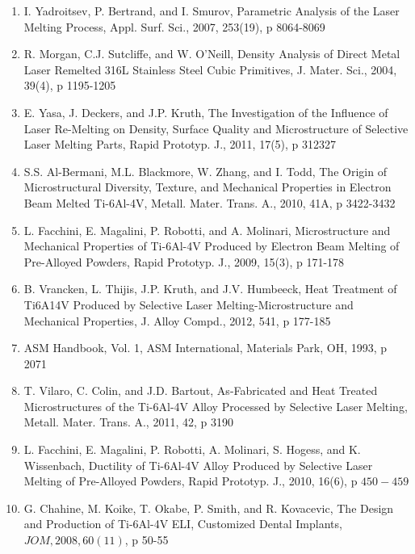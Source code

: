 \documentclass[10pt]{article}
\begin{document}
\begin{enumerate}
  \item I. Yadroitsev, P. Bertrand, and I. Smurov, Parametric Analysis of the Laser Melting Process, Appl. Surf. Sci., 2007, 253(19), p 8064-8069

  \item R. Morgan, C.J. Sutcliffe, and W. O'Neill, Density Analysis of Direct Metal Laser Remelted 316L Stainless Steel Cubic Primitives, J. Mater. Sci., 2004, 39(4), p 1195-1205

  \item E. Yasa, J. Deckers, and J.P. Kruth, The Investigation of the Influence of Laser Re-Melting on Density, Surface Quality and Microstructure of Selective Laser Melting Parts, Rapid Prototyp. J., 2011, 17(5), p 312327

  \item S.S. Al-Bermani, M.L. Blackmore, W. Zhang, and I. Todd, The Origin of Microstructural Diversity, Texture, and Mechanical Properties in Electron Beam Melted Ti-6Al-4V, Metall. Mater. Trans. A., 2010, 41A, p 3422-3432

  \item L. Facchini, E. Magalini, P. Robotti, and A. Molinari, Microstructure and Mechanical Properties of Ti-6Al-4V Produced by Electron Beam Melting of Pre-Alloyed Powders, Rapid Prototyp. J., 2009, 15(3), p 171-178

  \item B. Vrancken, L. Thijis, J.P. Kruth, and J.V. Humbeeck, Heat Treatment of Ti6A14V Produced by Selective Laser Melting-Microstructure and Mechanical Properties, J. Alloy Compd., 2012, 541, p 177-185

  \item ASM Handbook, Vol. 1, ASM International, Materials Park, OH, 1993, p 2071

  \item T. Vilaro, C. Colin, and J.D. Bartout, As-Fabricated and Heat Treated Microstructures of the Ti-6Al-4V Alloy Processed by Selective Laser Melting, Metall. Mater. Trans. A., 2011, 42, p 3190

  \item L. Facchini, E. Magalini, P. Robotti, A. Molinari, S. Hogess, and K. Wissenbach, Ductility of Ti-6Al-4V Alloy Produced by Selective Laser Melting of Pre-Alloyed Powders, Rapid Prototyp. J., 2010, 16(6), p $450-459$

  \item G. Chahine, M. Koike, T. Okabe, P. Smith, and R. Kovacevic, The Design and Production of Ti-6Al-4V ELI, Customized Dental Implants, $J O M, 2008,60(11)$, p 50-55


\end{enumerate}
\end{document}
